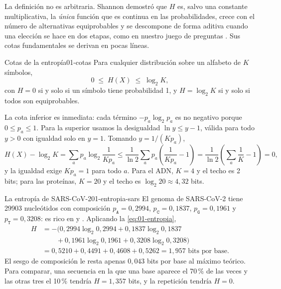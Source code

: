 La definición no es arbitraria. Shannon demostró que $H$ es, salvo una constante multiplicativa, la \emph{única} función que es continua en las probabilidades, crece con el número de alternativas equiprobables y se descompone de forma aditiva cuando una elección se hace en dos etapas, como en nuestro juego de preguntas \parencite{c01-shannon1948}. Sus cotas fundamentales se derivan en pocas líneas.

\begin{teorema}{Cotas de la entropía}{01-cotas}
Para cualquier distribución sobre un alfabeto de $K$ símbolos,
\begin{equation}\label{eq:01-cotas}
0 \;\le\; H(X) \;\le\; \log_2 K,
\end{equation}
con $H=0$ si y solo si un símbolo tiene probabilidad 1, y $H=\log_2 K$ si y solo si todos son equiprobables.
\end{teorema}

La cota inferior es inmediata: cada término $-p_a\log_2 p_a$ es no negativo porque $0\le p_a\le1$. Para la superior usamos la desigualdad $\ln y \le y-1$, válida para todo $y>0$ con igualdad solo en $y=1$. Tomando $y = 1/(Kp_a)$,
\[
H(X) - \log_2 K = \sum_a p_a \log_2\frac{1}{K p_a}
\le \frac{1}{\ln 2}\sum_a p_a\left(\frac{1}{Kp_a}-1\right)
= \frac{1}{\ln 2}\left(\sum_a \frac{1}{K} - 1\right) = 0,
\]
y la igualdad exige $Kp_a=1$ para todo $a$. Para el ADN, $K=4$ y el techo es 2 bits; para las proteínas, $K=20$ y el techo es $\log_2 20\approx 4{,}32$ bits.

\begin{ejemplo}{La entropía de SARS-CoV-2}{01-entropia-sars}
El genoma de SARS-CoV-2 tiene \num{29903} nucleótidos con composición $p_\texttt{A}=0{,}2994$, $p_\texttt{C}=0{,}1837$, $p_\texttt{G}=0{,}1961$ y $p_\texttt{T}=0{,}3208$: es rico en  y . Aplicando la \cref{eq:01-entropia},
\[
\begin{aligned}
H &= -\bigl(0{,}2994\log_2 0{,}2994 + 0{,}1837\log_2 0{,}1837 \\
  &\qquad + 0{,}1961\log_2 0{,}1961 + 0{,}3208\log_2 0{,}3208\bigr)\\
  &= 0{,}5210 + 0{,}4491 + 0{,}4608 + 0{,}5262 = 1{,}957 \text{ bits por base}.
\end{aligned}
\]
El sesgo de composición le resta apenas $0{,}043$ bits por base al máximo teórico. Para comparar, una secuencia en la que una base aparece el 70\,\% de las veces y las otras tres el 10\,\% tendría $H=1{,}357$ bits, y la repetición  tendría $H=0$.
\end{ejemplo}

